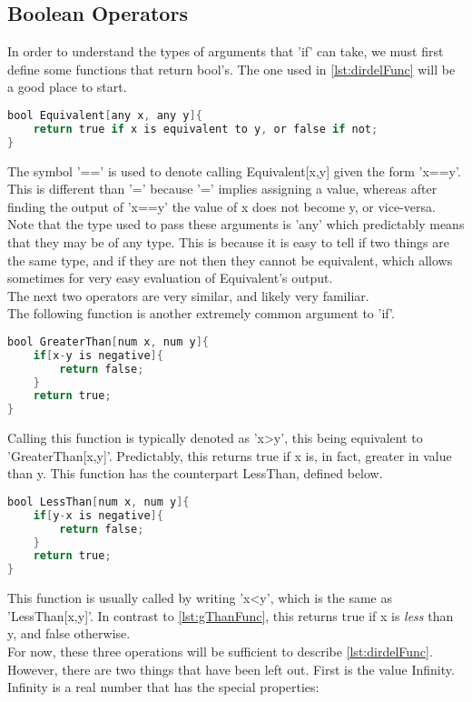 \subsection{Boolean Operators}
In order to understand the types of arguments that 'if' can take, we must first define some functions that return bool's. The one used in \ref{lst:dirdelFunc} will be a good place to start.
\begin{lstlisting}[language=C,caption=Equivalence Function,label=lst:equivFunc,mathescape]
bool Equivalent[any x, any y]{
	return true if x is equivalent to y, or false if not;
}
\end{lstlisting}
The symbol '==' is used to denote calling Equivalent[x,y] given the form 'x==y'. This is different than '=' because '=' implies assigning a value, whereas after finding the output of 'x==y' the value of x does not become y, or vice-versa. Note that the type used to pass these arguments is 'any' which predictably means that they may be of any type. This is because it is easy to tell if two things are the same type, and if they are not then they cannot be equivalent, which allows sometimes for very easy evaluation of Equivalent's output. \\
The next two operators are very similar, and likely very familiar. \\
The following function is another extremely common argument to 'if'.
\begin{lstlisting}[language=C,caption=Less Than Function,label=lst:gThanFunc,mathescape]
bool GreaterThan[num x, num y]{
	if[x-y is negative]{
		return false;
	}
	return true;
}
\end{lstlisting}
Calling this function is typically denoted as 'x>y', this being equivalent to 'GreaterThan[x,y]'. Predictably, this returns true if x is, in fact, greater in value than y. This function has the counterpart LessThan, defined below.
\begin{lstlisting}[language=C,caption=Less Than Function,label=lst:lThanFunc,mathescape]
bool LessThan[num x, num y]{
	if[y-x is negative]{
		return false;
	}
	return true;
}
\end{lstlisting}
This function is usually called by writing 'x<y', which is the same as 'LessThan[x,y]'. In contrast to \ref{lst:gThanFunc}, this returns true if x is \emph{less} than y, and false otherwise. \\
For now, these three operations will be sufficient to describe \ref{lst:dirdelFunc}. However, there are two things that have been left out. First is the value Infinity. Infinity is a real number that has the special properties:
